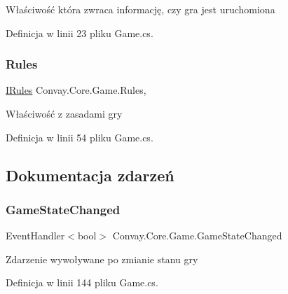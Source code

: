 Właściwość która zwraca informację, czy gra jest uruchomiona 



Definicja w linii 23 pliku Game.\+cs.

\hypertarget{class_convay_1_1_core_1_1_game_a414e7d9f72590cd7523edecc50df15da}{}\label{class_convay_1_1_core_1_1_game_a414e7d9f72590cd7523edecc50df15da} 
\subsubsection{\texorpdfstring{Rules}{Rules}}
{\footnotesize\ttfamily \hyperlink{interface_convay_1_1_core_1_1_interfaces_1_1_i_rules}{I\+Rules} Convay.\+Core.\+Game.\+Rules\hspace{0.3cm}{\ttfamily [get]}, {\ttfamily [set]}}



Właściwość z zasadami gry 



Definicja w linii 54 pliku Game.\+cs.



\subsection{Dokumentacja zdarzeń}
\hypertarget{class_convay_1_1_core_1_1_game_ab88c319349721a3a8e2a4e17ef2d60e6}{}\label{class_convay_1_1_core_1_1_game_ab88c319349721a3a8e2a4e17ef2d60e6} 
\subsubsection{\texorpdfstring{Game\+State\+Changed}{GameStateChanged}}
{\footnotesize\ttfamily Event\+Handler$<$bool$>$ Convay.\+Core.\+Game.\+Game\+State\+Changed}



Zdarzenie wywoływane po zmianie stanu gry 



Definicja w linii 144 pliku Game.\+cs.

\hypertarget{class_convay_1_1_core_1_1_game_ae2338714ffd4c5ff33dd8a67e0d7d573}{}\label{class_convay_1_1_core_1_1_game_ae2338714ffd4c5ff33dd8a67e0d7d573} 
